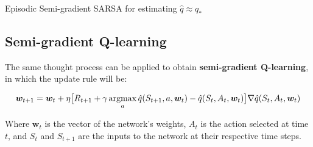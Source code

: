 \begin{algorithm}[H]
\DontPrintSemicolon
\SetAlgoVlined
{}

\caption{Episodic Semi-gradient SARSA for estimating $\hat{q} \approx q_*$}
\end{algorithm}

\subsection{Semi-gradient Q-learning}
The same thought process can be applied to obtain \textbf{semi-gradient Q-learning}, in which the update rule will be:

\begin{equation}
    \boldsymbol{w}_{t+1} = \boldsymbol{w}_t + \eta \big[ R_{t+1} + \gamma \operatorname*{argmax}_a  \hat{q}(S_{t+1},a,\boldsymbol{w}_t) - \hat{q}(S_t,A_t,\boldsymbol{w}_t) \big] \nabla \hat{q}(S_t,A_t,\boldsymbol{w}_t)
    \label{eq:ch7-qlearningqvaluefunctionapproxssdweightupdate}
\end{equation}

Where $\boldsymbol{w}_t$ is the vector of the network’s weights, $A_t$ is the action selected at time $t$, and $S_t$ and $S_{t+1}$ are the inputs to the network at their respective time steps.

